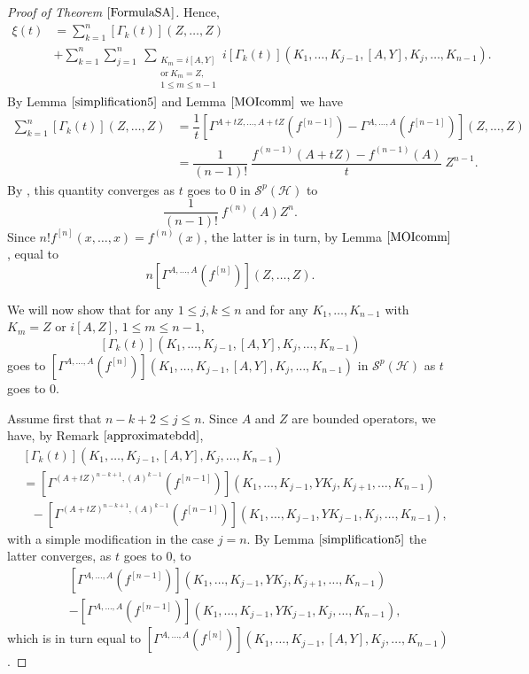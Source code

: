 \documentclass[12pt]{amsart}
\theoremstyle{remark}
\begin{document}
\begin{proof}[Proof of Theorem $\ref{FormulaSA}$]
Hence,
\begin{align*}
\xi(t) 
& = \sum_{k=1}^{n} \left[ \Gamma_k(t) \right] (Z, \ldots, Z) \\
& + \sum_{k=1}^{n} \sum_{j=1}^n \ \sum_{\substack{K_m = i[A,Y] \\\text{or} \ K_m=Z, \\ 1 \leq m \leq n-1}} i \left[ \Gamma_k(t) \right] (K_1, \ldots, K_{j-1}, [A,Y], K_j, \ldots, K_{n-1}).
\end{align*}
By Lemma $\ref{simplification5}$ and Lemma $\ref{MOIcomm}$ we have
\begin{align*}
\sum_{k=1}^{n} \left[ \Gamma_k(t) \right] (Z, \ldots, Z)
& = \dfrac{1}{t} \left[ \Gamma^{A+tZ,\ldots, A+tZ}(f^{[n-1]}) - \Gamma^{A,\ldots, A}(f^{[n-1]}) \right](Z, \ldots, Z) \\
& = \dfrac{1}{(n-1)!} \ \dfrac{f^{(n-1)}(A+tZ)-f^{(n-1)}(A) }{t} \ Z^{n-1}.
\end{align*}
By \cite[Lemma 3.4 (ii)]{KS}, this quantity converges as $t$ goes to $0$ in $\mathcal{S}^p(\mathcal{H})$ to
$$
\dfrac{1}{(n-1)!} \ f^{(n)}(A) Z^n.
$$
Since $n! f^{[n]}(x,\ldots,x) = f^{(n)}(x)$, the latter is in turn, by Lemma $\ref{MOIcomm}$, equal to
$$
n \left[\Gamma^{A,\ldots, A}(f^{[n]}) \right](Z, \ldots, Z).
$$

We will now show that for any $1\leq j,k \leq n$ and for any $K_1, \ldots, K_{n-1}$ with $K_m= Z$ or $i[A,Z]$, $1\leq m \leq n-1$, 
$$
\left[\Gamma_k(t)\right](K_1, \ldots, K_{j-1}, [A,Y], K_j, \ldots, K_{n-1})
$$
goes to $\left[\Gamma^{A,\ldots, A}(f^{[n]}) \right](K_1, \ldots, K_{j-1}, [A,Y], K_j, \ldots, K_{n-1})$ in $\mathcal{S}^p(\mathcal{H})$ as $t$ goes to $0$.

Assume first that $n-k+2 \leq j \leq n$. Since $A$ and $Z$ are bounded operators, we have, by Remark $\ref{approximatebdd}$,
\begin{align*}
& \left[\Gamma_k(t)\right](K_1, \ldots, K_{j-1}, [A,Y], K_j, \ldots, K_{n-1}) \\
& = \left[\Gamma^{(A+tZ)^{n-k+1},(A)^{k-1}}(f^{[n-1]}) \right](K_1, \ldots, K_{j-1}, YK_j, K_{j+1}, \ldots, K_{n-1}) \\
& \ \ \ - \left[\Gamma^{(A+tZ)^{n-k+1},(A)^{k-1}}(f^{[n-1]}) \right](K_1, \ldots, K_{j-1}, YK_{j-1}, K_j, \ldots, K_{n-1}),
\end{align*}
with a simple modification in the case $j=n$. By Lemma $\ref{simplification5}$ the latter converges, as $t$ goes to $0$, to
\begin{align*}
&\left[\Gamma^{A, \ldots, A}(f^{[n-1]}) \right](K_1, \ldots, K_{j-1}, YK_j, K_{j+1}, \ldots, K_{n-1}) \\
& - \left[\Gamma^{A, \ldots, A}(f^{[n-1]}) \right](K_1, \ldots, K_{j-1}, YK_{j-1}, K_j, \ldots, K_{n-1}),
\end{align*}
which is in turn equal to $\left[\Gamma^{A,\ldots, A}(f^{[n]}) \right](K_1, \ldots, K_{j-1}, [A,Y], K_j, \ldots, K_{n-1})$.


\end{proof}
\end{document}
